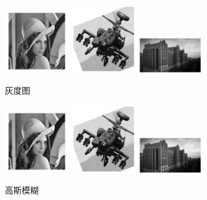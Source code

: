 \documentclass{article}
\begin{document}
\begin{figure}[h]
    \centering
    \includegraphics[width=0.25\textwidth]{./grey_image/1}
    \includegraphics[width=0.25\textwidth]{./grey_image/2}
    \includegraphics[width=0.25\textwidth]{./grey_image/3}
    \caption{灰度图}\label{figure3}
\end{figure}

\begin{figure}[h]
    \centering
    \includegraphics[width=0.25\textwidth]{./gauss_blur/1}
    \includegraphics[width=0.25\textwidth]{./gauss_blur/2}
    \includegraphics[width=0.25\textwidth]{./gauss_blur/3}
    \caption{高斯模糊}\label{figure4}
\end{figure}
\end{document}

